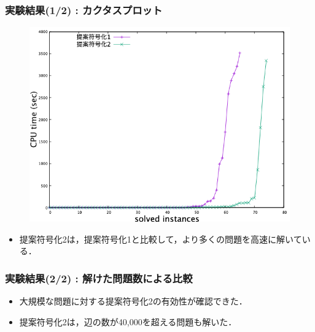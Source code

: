 \documentclass[dvipdfmx,11pt]{beamer}
\begin{document}
\begin{frame}\frametitle{実験結果(1/2) : カクタスプロット}
 \begin{figure}[h]
  \centering
  \includegraphics[scale=0.38]{fig/cactus.png}
 \end{figure}

\begin{itemize}
 \item 提案符号化2は，提案符号化1と比較して，より多くの問題を高速に解いている．
\end{itemize}
\end{frame}

\begin{frame}\frametitle{実験結果(2/2) : 解けた問題数による比較} %

\begin{table}[t]
 \centering
 
\end{table}

\begin{itemize}
 \item 大規模な問題に対する提案符号化2の有効性が確認できた．
 \item 提案符号化2は，辺の数が40,000を超える問題も解いた．
\end{itemize}

\end{frame}
\end{document}
